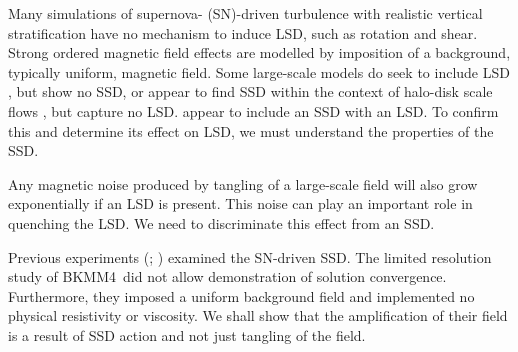 \documentclass[preprint2]{aastex63}
\newcommand\BKM{{\sf BKMM4}}
\begin{document}
 Many simulations of supernova- (SN)-driven turbulence with realistic vertical
 stratification \citep[e.g.,][]{deAvillez:2005,PO07,Hill:2012a,HI14} have no
 mechanism to induce LSD, such as rotation and shear.
 Strong ordered magnetic field effects are modelled by
 imposition of a background, typically uniform, magnetic field.
 {Some large-scale models do seek to include LSD 
 \citep[e.g.,][]{Korpi:1999b,Gressel:2008,HWK09,WA09,Pakmor17,
 GE20}, but show no SSD, or appear to find SSD 
 within the context of halo-disk
 scale flows \citep[e.g.,][]{RT16,SBADMN19},  but capture no LSD.}
\citet[][with additional analysis by \citealt{EGSFB16}]{Gent:2013b}
 appear to include an {SSD with} {an} {LSD}.
 To confirm this and determine its effect on LSD, we must understand the
 properties of the SSD.
     
 Any magnetic noise produced by tangling {of a large-scale field}
 will also grow exponentially {if an LSD is} present.
 This noise {can play} an important role in quenching the LSD.
 We need to discriminate this effect from an SSD.   

 Previous experiments ({\citealp[e.g.,][hereafter \BKM]{BKMM04};
 \citealp{BalKim05,MacLow:2005}})
 examined the SN-driven SSD.
 {The limited  resolution} {study} of \BKM\ did not allow
 demonstration of {solution} convergence.
     Furthermore, they imposed a uniform background field and
      implemented no physical resistivity or viscosity.
 We shall show that the amplification of their field is a result
 of SSD action and not just tangling of the field.
\end{document}
